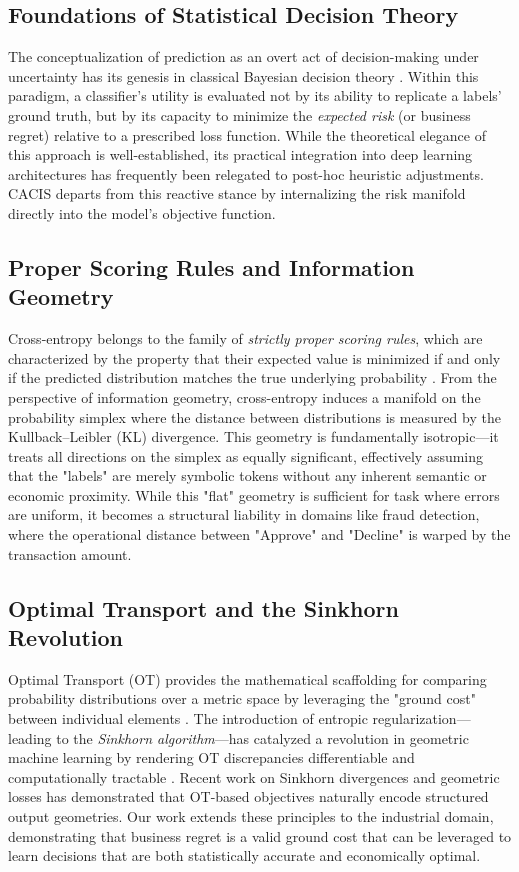\documentclass[sigconf,anonymous]{acmart}
\newcommand{\CACIS}{\textsc{CACIS}}
\begin{document}
\subsection{Foundations of Statistical Decision Theory}
The conceptualization of prediction as an overt act of decision-making under uncertainty has its genesis in classical Bayesian decision theory \citep{berger1985statistical}. Within this paradigm, a classifier's utility is evaluated not by its ability to replicate a labels' ground truth, but by its capacity to minimize the \emph{expected risk} (or business regret) relative to a prescribed loss function. While the theoretical elegance of this approach is well-established, its practical integration into deep learning architectures has frequently been relegated to post-hoc heuristic adjustments. \CACIS{} departs from this reactive stance by internalizing the risk manifold directly into the model's objective function.

\subsection{Proper Scoring Rules and Information Geometry}
Cross-entropy belongs to the family of \emph{strictly proper scoring rules}, which are characterized by the property that their expected value is minimized if and only if the predicted distribution matches the true underlying probability \citep{gneiting2007strictly}. From the perspective of information geometry, cross-entropy induces a manifold on the probability simplex where the distance between distributions is measured by the Kullback--Leibler (KL) divergence. This geometry is fundamentally isotropic—it treats all directions on the simplex as equally significant, effectively assuming that the "labels" are merely symbolic tokens without any inherent semantic or economic proximity. While this "flat" geometry is sufficient for task where errors are uniform, it becomes a structural liability in domains like fraud detection, where the operational distance between "Approve" and "Decline" is warped by the transaction amount.

\subsection{Optimal Transport and the Sinkhorn Revolution}
Optimal Transport (OT) provides the mathematical scaffolding for comparing probability distributions over a metric space by leveraging the "ground cost" between individual elements \citep{villani2008optimal}. The introduction of entropic regularization—leading to the \emph{Sinkhorn algorithm}—has catalyzed a revolution in geometric machine learning by rendering OT discrepancies differentiable and computationally tractable \citep{cuturi2013sinkhorn, peyre2019computational}. Recent work on Sinkhorn divergences \citep{genevay2018learning, feydy2019interpolating} and geometric losses \citep{mensch2019geometric} has demonstrated that OT-based objectives naturally encode structured output geometries. Our work extends these principles to the industrial domain, demonstrating that business regret is a valid ground cost that can be leveraged to learn decisions that are both statistically accurate and economically optimal.
\end{document}

